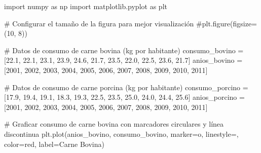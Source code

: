 \documentclass[
  jou,
  floatsintext,
  longtable,
  a4paper,
  nolmodern,
  notxfonts,
  notimes,
  12pt,
  colorlinks=true,linkcolor=blue,citecolor=blue,urlcolor=blue]{apa7}
\newenvironment{Shaded}{\begin{snugshade}}{\end{snugshade}}
\newcommand{\CommentTok}[1]{\textcolor[rgb]{0.37,0.37,0.37}{#1}}
\newcommand{\DecValTok}[1]{\textcolor[rgb]{0.68,0.00,0.00}{#1}}
\newcommand{\FloatTok}[1]{\textcolor[rgb]{0.68,0.00,0.00}{#1}}
\newcommand{\ImportTok}[1]{\textcolor[rgb]{0.00,0.46,0.62}{#1}}
\newcommand{\NormalTok}[1]{\textcolor[rgb]{0.00,0.23,0.31}{#1}}
\newcommand{\OperatorTok}[1]{\textcolor[rgb]{0.37,0.37,0.37}{#1}}
\newcommand{\StringTok}[1]{\textcolor[rgb]{0.13,0.47,0.30}{#1}}
\begin{document}
\begin{Shaded}
\begin{Highlighting}[]
\ImportTok{import}\NormalTok{ numpy }\ImportTok{as}\NormalTok{ np}
\ImportTok{import}\NormalTok{ matplotlib.pyplot }\ImportTok{as}\NormalTok{ plt}

\CommentTok{\# Configurar el tamaño de la figura para mejor visualización}
\CommentTok{\#plt.figure(figsize=(10, 8))}

\CommentTok{\# Datos de consumo de carne bovina (kg por habitante)}
\NormalTok{consumo\_bovino }\OperatorTok{=}\NormalTok{ [}\FloatTok{22.1}\NormalTok{, }\FloatTok{22.1}\NormalTok{, }\FloatTok{23.1}\NormalTok{, }\FloatTok{23.9}\NormalTok{, }\FloatTok{24.6}\NormalTok{, }\FloatTok{21.7}\NormalTok{, }\FloatTok{23.5}\NormalTok{, }\FloatTok{22.0}\NormalTok{, }\FloatTok{22.5}\NormalTok{, }\FloatTok{23.6}\NormalTok{, }\FloatTok{21.7}\NormalTok{]}
\NormalTok{anios\_bovino }\OperatorTok{=}\NormalTok{ [}\DecValTok{2001}\NormalTok{, }\DecValTok{2002}\NormalTok{, }\DecValTok{2003}\NormalTok{, }\DecValTok{2004}\NormalTok{, }\DecValTok{2005}\NormalTok{, }\DecValTok{2006}\NormalTok{, }\DecValTok{2007}\NormalTok{, }\DecValTok{2008}\NormalTok{, }\DecValTok{2009}\NormalTok{, }\DecValTok{2010}\NormalTok{, }\DecValTok{2011}\NormalTok{]}

\CommentTok{\# Datos de consumo de carne porcina (kg por habitante)}
\NormalTok{consumo\_porcino }\OperatorTok{=}\NormalTok{ [}\FloatTok{17.9}\NormalTok{, }\FloatTok{19.4}\NormalTok{, }\FloatTok{19.1}\NormalTok{, }\FloatTok{18.3}\NormalTok{, }\FloatTok{19.3}\NormalTok{, }\FloatTok{22.5}\NormalTok{, }\FloatTok{23.5}\NormalTok{, }\FloatTok{25.0}\NormalTok{, }\FloatTok{24.0}\NormalTok{, }\FloatTok{24.4}\NormalTok{, }\FloatTok{25.6}\NormalTok{]}
\NormalTok{anios\_porcino }\OperatorTok{=}\NormalTok{ [}\DecValTok{2001}\NormalTok{, }\DecValTok{2002}\NormalTok{, }\DecValTok{2003}\NormalTok{, }\DecValTok{2004}\NormalTok{, }\DecValTok{2005}\NormalTok{, }\DecValTok{2006}\NormalTok{, }\DecValTok{2007}\NormalTok{, }\DecValTok{2008}\NormalTok{, }\DecValTok{2009}\NormalTok{, }\DecValTok{2010}\NormalTok{, }\DecValTok{2011}\NormalTok{]}

\CommentTok{\# Graficar consumo de carne bovina con marcadores circulares y línea discontinua}
\NormalTok{plt.plot(anios\_bovino, consumo\_bovino, marker}\OperatorTok{=}\StringTok{\textquotesingle{}o\textquotesingle{}}\NormalTok{, linestyle}\OperatorTok{=}\StringTok{\textquotesingle{}{-}{-}\textquotesingle{}}\NormalTok{, color}\OperatorTok{=}\StringTok{\textquotesingle{}red\textquotesingle{}}\NormalTok{, label}\OperatorTok{=}\StringTok{\textquotesingle{}Carne Bovina\textquotesingle{}}\NormalTok{)}


\end{Highlighting}
\end{Shaded}
\end{document}
